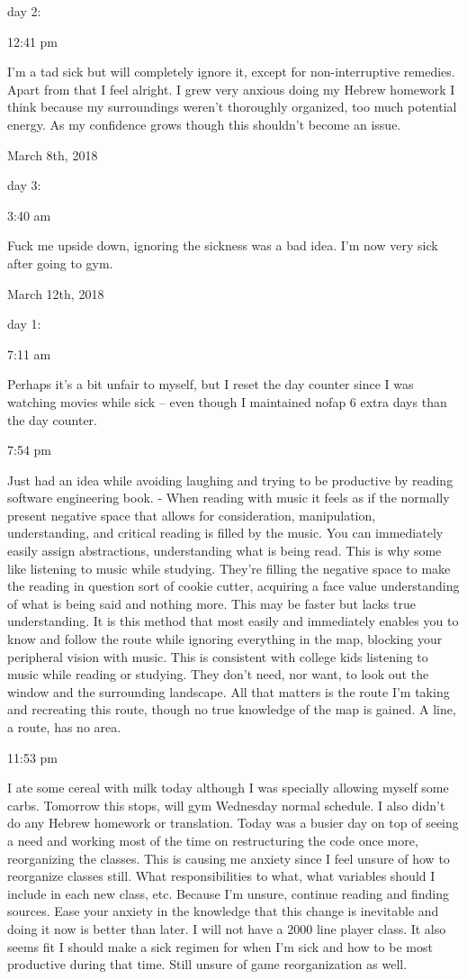 day 2:

12:41 pm

I'm a tad sick but will completely ignore it, except for
non-interruptive remedies. Apart from that I feel alright. I grew very
anxious doing my Hebrew homework I think because my surroundings weren't
thoroughly organized, too much potential energy. As my confidence grows
though this shouldn't become an issue.

\bigskip
\bigskip
March 8th, 2018

day 3:

3:40 am

Fuck me upside down, ignoring the sickness was a bad idea. I'm now very
sick after going to gym.

\bigskip
\bigskip
March 12th, 2018

day 1:

7:11 am

Perhaps it's a bit unfair to myself, but I reset the day counter since I
was watching movies while sick -- even though I maintained nofap 6 extra
days than the day counter.

7:54 pm

Just had an idea while avoiding laughing and trying to be productive by
reading software engineering book. - When reading with music it feels as
if the normally present negative space that allows for consideration,
manipulation, understanding, and critical reading is filled by the
music. You can immediately easily assign abstractions, understanding
what is being read. This is why some like listening to music while
studying. They're filling the negative space to make the reading in
question sort of cookie cutter, acquiring a face value understanding of
what is being said and nothing more. This may be faster but lacks true
understanding. It is this method that most easily and immediately
enables you to know and follow the route while ignoring everything in
the map, blocking your peripheral vision with music. This is consistent
with college kids listening to music while reading or studying. They
don't need, nor want, to look out the window and the surrounding
landscape. All that matters is the route I'm taking and recreating this
route, though no true knowledge of the map is gained. A line, a route,
has no area.

11:53 pm

I ate some cereal with milk today although I was specially allowing
myself some carbs. Tomorrow this stops, will gym Wednesday normal
schedule. I also didn't do any Hebrew homework or translation. Today was
a busier day on top of seeing a need and working most of the time on
restructuring the code once more, reorganizing the classes. This is
causing me anxiety since I feel unsure of how to reorganize classes
still. What responsibilities to what, what variables should I include in
each new class, etc. Because I'm unsure, continue reading and finding
sources. Ease your anxiety in the knowledge that this change is
inevitable and doing it now is better than later. I will not have a 2000
line player class. It also seems fit I should make a sick regimen for
when I'm sick and how to be most productive during that time. Still
unsure of game reorganization as well.

